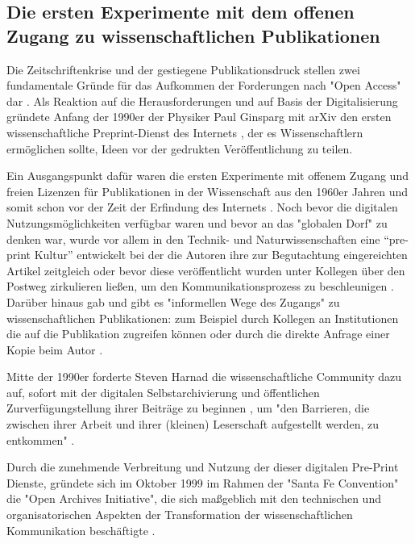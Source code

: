 \subsection{Die ersten Experimente mit dem offenen Zugang zu wissenschaftlichen Publikationen}

Die Zeitschriftenkrise und der gestiegene Publikationsdruck stellen zwei fundamentale Gründe für das Aufkommen der Forderungen nach "Open Access" dar \cite{Brintzinger_2010} \cite{wein_2010_erwerbung}. Als Reaktion auf die Herausforderungen und auf Basis der Digitalisierung gründete Anfang der 1990er der Physiker Paul Ginsparg mit arXiv den ersten wissenschaftliche Preprint-Dienst des Internets \cite{cite:5} \cite{bjork_2004_open}, der es Wissenschaftlern ermöglichen sollte, Ideen vor der gedrukten Veröffentlichung zu teilen.

Ein Ausgangspunkt dafür waren die ersten Experimente mit offenem Zugang und freien Lizenzen für Publikationen in der Wissenschaft aus den 1960er Jahren und somit schon vor der Zeit der Erfindung des Internets \cite{cite:18b}. Noch bevor die digitalen Nutzungsmöglichkeiten verfügbar waren und bevor an das "globalen Dorf"\cite{mcluhan_1962_gutenberg} zu denken war, wurde vor allem in den Technik- und Naturwissenschaften eine “pre-print Kultur” entwickelt bei der die Autoren ihre zur Begutachtung eingereichten Artikel zeitgleich oder bevor diese veröffentlicht wurden unter Kollegen über den Postweg zirkulieren ließen, um den Kommunikationsprozess zu beschleunigen \cite{suchen-Hoffmann-Zugang-undVerwertung-oeffentlicher-Informationen}. Darüber hinaus gab und gibt es "informellen Wege des Zugangs" zu wissenschaftlichen Publikationen: zum Beispiel durch Kollegen an Institutionen die auf die Publikation zugreifen können oder durch die direkte Anfrage einer Kopie beim Autor \cite{davis_2011_open}.

Mitte der 1990er forderte Steven Harnad die wissenschaftliche Community dazu auf, sofort mit der digitalen Selbstarchivierung und öffentlichen Zurverfügungstellung ihrer Beiträge zu beginnen \cite{albert_2006_open_implications}, um "den Barrieren, die zwischen ihrer Arbeit und ihrer (kleinen) Leserschaft aufgestellt werden, zu entkommen" \cite{harnad_1995_subversive_proposal}.

Durch die zunehmende Verbreitung und Nutzung der dieser digitalen Pre-Print Dienste, gründete sich im Oktober 1999 im Rahmen der "Santa Fe Convention" die "Open Archives Initiative", die sich maßgeblich mit den technischen und organisatorischen Aspekten der Transformation der wissenschaftlichen Kommunikation beschäftigte \cite{van_2000_santa_fe}.


